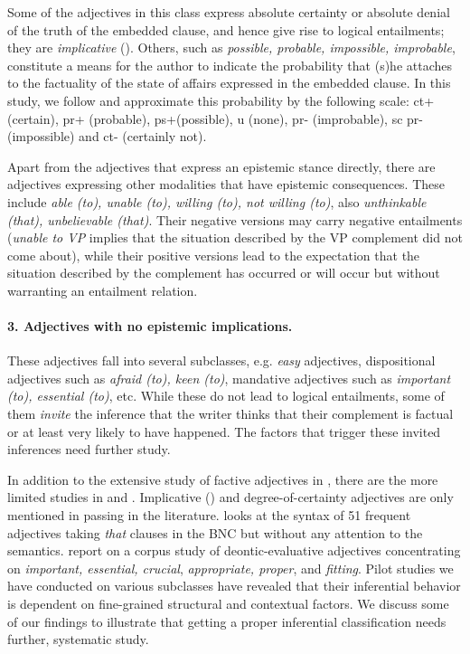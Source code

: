 \documentclass[10pt]{article}
\begin{document}
Some of the adjectives in this class express absolute certainty or absolute denial of the truth of the embedded clause, and hence give rise to logical entailments; they are \textit{implicative} (\cite{karttunen:1971}). Others, such as \textit{possible, probable, impossible, improbable}, 
constitute a means for the author  to indicate the probability that (s)he attaches to the factuality of the state of affairs expressed in the embedded clause. In this study, we follow \cite{sauri:2008phd} and approximate this probability by the following scale: {\sc ct}+ (certain), {\sc pr}+ (probable), {\sc ps}+(possible), {\sc u} (none), {\sc pr}- (improbable), {sc pr}- (impossible) and {\sc ct}- (certainly not).

Apart from the adjectives that express an epistemic stance directly, there are adjectives expressing other modalities that have epistemic consequences. These include \textit{able (to), unable (to), willing (to), not willing (to)}, also \textit{unthinkable (that), unbelievable (that)}. Their negative versions may carry negative entailments (\textit{unable to VP} implies that the situation 
described  by the VP complement did not come about), while their positive versions lead to the expectation that the situation described by the complement has occurred or will occur but without warranting an entailment relation.

\vspace{-.2in}
\paragraph{3. Adjectives with no epistemic implications.}
These adjectives fall into several subclasses, e.g. \textit{easy} adjectives, dispositional adjectives such as \textit{afraid (to), keen (to)}, mandative adjectives such as \textit{important (to), essential (to)}, etc. While these do not lead to logical entailments, some of them \textit{invite} the inference that the writer thinks that their complement is factual or at least very likely to have happened. The factors that trigger these invited inferences need further study.

In addition to the extensive study of factive adjectives in \cite{norrick:1978},
there are the more limited studies in \cite{wilkinson:1970} and \cite{barker:2002}. Implicative (\cite{karttunen:1971}) and degree-of-certainty adjectives are only mentioned in passing in the literature. \cite{mindt:2011} looks at the syntax of 51 frequent adjectives taking \emph{that }clauses in the BNC but without any attention to the semantics. \cite{vanlinden+davidse:2009} report on a corpus study of deontic-evaluative adjectives concentrating on \emph{important, essential, crucial}, \emph{appropriate, proper}, and \emph{fitting}.
Pilot studies we have conducted on various subclasses have revealed  that their inferential behavior is dependent on fine-grained structural and contextual factors. We discuss some of our findings to illustrate that getting a proper inferential classification  needs further, systematic study.
\end{document}
